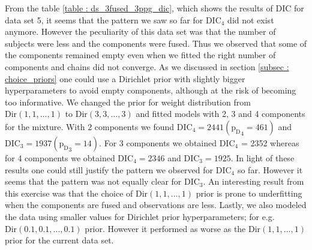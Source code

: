 From the table \ref{table : ds_3fused_3ppg_dic}, which shows the results of DIC for data set 5, it seems that the pattern we saw so far for $\text{DIC}_4$ did not exist anymore. However the peculiarity of this data set was that the number of subjects were less and the components were fused. Thus we observed that some of the components remained empty even when we fitted the right number of components and chains did not converge. As we discussed in section \ref{subsec : choice_priors} one could use a Dirichlet prior with slightly bigger hyperparameters to avoid empty components, although at the risk of becoming too informative. We changed the prior for weight distribution from $\text{Dir}(1, 1, ..., 1)$ to $\text{Dir}(3, 3, ..., 3)$ and fitted models with 2, 3 and 4 components for the mixture. With 2 components we found $\text{DIC}_4 = 2441 ({\text{p}_\text{D}}_4 = 461)$ and $\text{DIC}_3 = 1937 ({\text{p}_\text{D}}_3 = 14)$. For 3 components we obtained $\text{DIC}_4$ = 2352 whereas for 4 components we obtained $\text{DIC}_4 = 2346$ and $\text{DIC}_3 = 1925$. In light of these results one could still justify the pattern we observed for $\text{DIC}_4$ so far. However it seems that the pattern was not equally clear for $\text{DIC}_3$. An interesting result from this exercise was that the choice of $\text{Dir}(1, 1, ..., 1)$ prior is prone to underfitting when the components are fused and observations are less. Lastly, we also modeled the data using smaller values for Dirichlet prior hyperparameters; for e.g. $\text{Dir}(0.1, 0.1, ..., 0.1)$ prior. However it performed as worse as the $\text{Dir}(1, 1, ..., 1)$ prior for the current data set.\\


